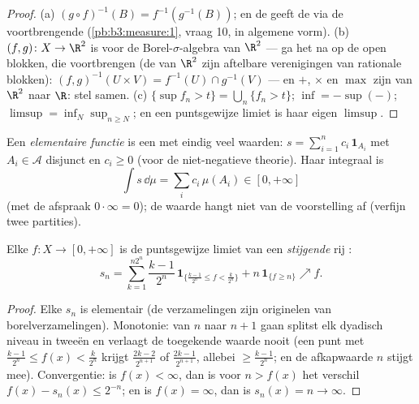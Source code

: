 \begin{proof}
(a) $(g\circ f)^{-1}(B) = f^{-1}(g^{-1}(B))$; en de 
geeft de  via de voortbrengende 
(\cref{pb:b3:measure:1}, vraag 10, in algemene vorm).
(b) $(f, g) \colon X \to \R^2$ is  voor de
Borel-$\sigma$-algebra van $\R^2$ --- ga het na op de open blokken,
die voortbrengen (de  van $\R^2$ zijn aftelbare
verenigingen van rationale blokken): $(f,g)^{-1}(U\times V) =
f^{-1}(U)\cap g^{-1}(V)$ --- en $+$, $\times$ en $\max$ zijn
 van $\R^2$ naar $\R$: stel samen.
(c) $\{\sup f_n > t\} = \bigcup_n\{f_n > t\}$; $\inf = -\sup(-)$;
$\limsup = \inf_N\sup_{n \geq N}$; en een puntsgewijze limiet is
haar eigen $\limsup$.
\end{proof}

\begin{definition}\label{def:b3:lebesgue:simple}
Een \emph{elementaire functie} is een
 met eindig veel waarden: $s = \sum_{i=1}^n
c_i\,\mathbf 1_{A_i}$ met $A_i \in \mathcal A$ disjunct en $c_i
\geq 0$ (voor de niet-negatieve theorie). Haar integraal is
\[
\int s\,\dd\mu = \sum_i c_i\,\mu(A_i) \in [0, +\infty]
\]
(met de afspraak $0\cdot\infty = 0$); de waarde hangt niet van de
voorstelling af (verfijn twee partities).
\end{definition}

\begin{theorem}
\label{thm:b3:lebesgue:approximation}
Elke  $f \colon X \to [0, +\infty]$ is de puntsgewijze
limiet van een \emph{stijgende} rij :
\[
s_n = \sum_{k=1}^{n2^n} \frac{k-1}{2^n}\,
\mathbf 1_{\{\frac{k-1}{2^n} \leq f < \frac k{2^n}\}}
+ n\,\mathbf 1_{\{f \geq n\}} \nearrow f .
\]
\end{theorem}

\begin{proof}
Elke $s_n$ is elementair (de verzamelingen zijn originelen van
borelverzamelingen). Monotonie: van $n$ naar $n+1$ gaan splitst
elk dyadisch niveau in tweeën en verlaagt de toegekende waarde
nooit (een punt met $\frac{k-1}{2^n} \leq f(x) < \frac k{2^n}$
krijgt $\frac{2k-2}{2^{n+1}}$ of $\frac{2k-1}{2^{n+1}}$, allebei
$\geq \frac{k-1}{2^n}$; en de afkapwaarde $n$ stijgt mee).
Convergentie: is $f(x) < \infty$, dan is voor $n > f(x)$ het
verschil $f(x) - s_n(x) \leq 2^{-n}$; en is $f(x) = \infty$, dan is
$s_n(x) = n \to \infty$.
\end{proof}

